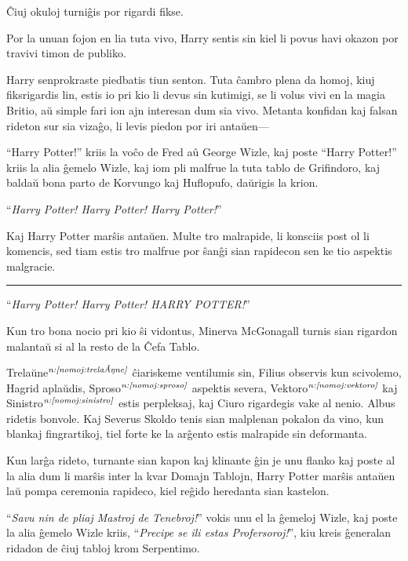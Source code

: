 Ĉiuj okuloj turniĝis por rigardi fikse.

Por la unuan fojon en lia tuta vivo, Harry sentis sin kiel li povus havi
okazon por travivi timon de publiko.

Harry senprokraste piedbatis tiun senton. Tuta ĉambro plena da homoj,
kiuj fiksrigardis lin, estis io pri kio li devus sin kutimigi, se li
volus vivi en la magia Britio, aŭ simple fari ion ajn interesan dum
sia vivo. Metanta konfidan kaj falsan rideton sur sia vizaĝo, li levis
piedon por iri antaŭen—

``Harry Potter!'' kriis la voĉo de Fred aû George Wizle, kaj poste
``Harry Potter!'' kriis la alia ĝemelo Wizle, kaj iom pli malfrue la
tuta tablo de Grifindoro, kaj baldaŭ bona parto de Korvungo kaj
Huflopufo, daŭrigis la krion.

``\emph{Harry Potter! Harry Potter! Harry Potter!}''

Kaj Harry Potter marŝis antaŭen. Multe tro malrapide, li konsciis post
ol li komencis, sed tiam estis tro malfrue por ŝanĝi sian rapidecon
sen ke tio aspektis malgracie.

\begin{center}\rule{3in}{0.4pt}\end{center}

``\emph{Harry Potter! Harry Potter! HARRY POTTER!}'' 

Kun tro bona nocio pri kio ŝi vidontus, Minerva McGonagall turnis sian
rigardon malantaŭ si al la resto de la Ĉefa Tablo.

Trelaŭne$^{\textit{n:\ref{nomoj:trelaŭne}}}$ ĉiariskeme ventilumis sin, Filius
observis kun scivolemo, Hagrid aplaŭdis, Sproso$^{\textit{n:\ref{nomoj:sproso}}}$
aspektis severa, Vektoro$^{\textit{n:\ref{nomoj:vektoro}}}$ kaj
Sinistro$^{\textit{n:\ref{nomoj:sinistro}}}$ estis perpleksaj, kaj Ciuro rigardegis
vake al nenio. Albus ridetis bonvole. Kaj Severus Skoldo tenis sian
malplenan pokalon da vino, kun blankaj fingrartikoj, tiel forte ke la
arĝento estis malrapide sin deformanta.

Kun larĝa rideto, turnante sian kapon kaj klinante ĝin je unu flanko
kaj poste al la alia dum li marŝis inter la kvar Domajn Tablojn, Harry
Potter marŝis antaŭen laŭ pompa ceremonia rapideco, kiel reĝido
heredanta sian kastelon.

``\emph{Savu nin de pliaj Mastroj de Tenebroj!}'' vokis unu el la
ĝemeloj Wizle, kaj poste la alia ĝemelo Wizle kriis, ``\emph{Precipe
  se ili estas Profersoroj!}'', kiu kreis ĝeneralan ridadon de ĉiuj
tabloj krom Serpentimo.

